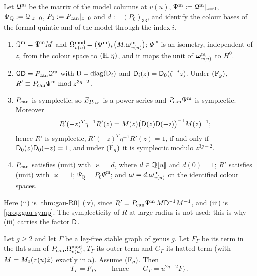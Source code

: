 \begin{lem}
\label{lem:flh-inputs}
Let $\mathcal{Q}^{\mathrm m}$ be the matrix of the model columns at $v(u)$, $\Psi^{\mathrm m}:=\mathcal{Q}^{\mathrm m}|_{z=0}$, $\Psi_{\mathrm Q}:=\mathcal{Q}|_{z=0}$, $P_0:=P_{\mathrm{can}}|_{z=0}$ and $d:=(P_0)_{33}$, and identify the colour bases of the formal quintic and of the model through the index $i$.
\begin{enumerate}
\item $\mathcal{Q}^{\mathrm m}=\Psi^{\mathrm m}M$ and $\Omega^{\mathrm{mod}}_{v(u)}=(\Psi^{\mathrm m})_*\bigl(M.\boldsymbol{\omega}^{\mathrm m}_{v(u)}\bigr)$; $\Psi^{\mathrm m}$ is an isometry, independent of $z$, from the colour space to $(\mathbb{H},\eta)$, and it maps the unit of $\boldsymbol{\omega}^{\mathrm m}_{v(u)}$ to $H^0$.
\item $\mathcal{Q}\mathsf{D}=P_{\mathrm{can}}\mathcal{Q}^{\mathrm m}$ with $\mathsf{D}=\operatorname{diag}(\mathsf{D}_i)$ and $\mathsf{D}_i(z)=\mathsf{D}_0(\zeta^{-i}z)$. Under $(\mathrm{F}_{g})$, $R'\equiv P_{\mathrm{can}}\Psi^{\mathrm m}\bmod z^{3g-2}$.
\item $P_{\mathrm{can}}$ is symplectic; so $E_{P_{\mathrm{can}}}$ is a power series and $P_{\mathrm{can}}\Psi^{\mathrm m}$ is symplectic. Moreover
\[
R'(-z)^T\eta^{-1}R'(z)=M(z)\bigl(\mathsf{D}(z)\mathsf{D}(-z)\bigr)^{-1}M(z)^{-1};
\]
hence $R'$ is symplectic, $R'(-z)^T\eta^{-1}R'(z)=1$, if and only if $\mathsf{D}_0(z)\mathsf{D}_0(-z)=1$, and under $(\mathrm{F}_{g})$ it is symplectic modulo $z^{3g-2}$.
\item $P_{\mathrm{can}}$ satisfies (unit) with $\varkappa=d$, where $d\in\mathbb{Q}[\![ u ]\!]$ and $d(0)=1$; $R'$ satisfies (unit) with $\varkappa=1$; $\Psi_{\mathrm Q}=P_0\Psi^{\mathrm m}$; and $\boldsymbol{\omega}=d.\boldsymbol{\omega}^{\mathrm m}_{v(u)}$ on the identified colour spaces.
\end{enumerate}
\end{lem}

Here (ii) is \cref{thm:gau-R0}~(iv), since $R'=P_{\mathrm{can}}\Psi^{\mathrm m}\,M\mathsf{D}^{-1}M^{-1}$, and (iii) is \cref{prop:gau-symp}. The symplecticity of $R$ at large radius is not used: this is why (iii) carries the factor $\mathsf{D}$.

\begin{thm}
\label{thm:flh-main}
Let $g\geq2$ and let $\Gamma$ be a leg-free stable graph of genus $g$. Let $F_\Gamma$ be its term in the flat sum of $P_{\mathrm{can}}.\Omega^{\mathrm{mod}}_{v(u)}$, $T_\Gamma$ its outer term and $G_\Gamma$ its hatted term (with $M=M_{0}(\tau(u)\hat{z})$ exactly in $u$). Assume $(\mathrm{F}_{g})$. Then
\[
T_\Gamma=F_\Gamma,\qquad\text{hence}\qquad G_\Gamma=u^{2g-2}F_\Gamma .
\]
\end{thm}

